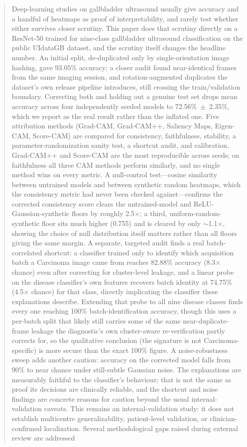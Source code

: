 \begin{abstract}
Deep-learning studies on gallbladder ultrasound usually give accuracy and a handful of heatmaps as proof of interpretability, and rarely test whether either survives closer scrutiny. This paper does that scrutiny directly on a ResNet-50 trained for nine-class gallbladder ultrasound classification on the public UIdataGB dataset, and the scrutiny itself changes the headline number. An initial split, de-duplicated only by single-orientation image hashing, gave 93.05\% accuracy; a closer audit found near-identical frames from the same imaging session, and rotation-augmented duplicates the dataset's own release pipeline introduces, still crossing the train/validation boundary. Correcting both and holding out a genuine test set drops mean accuracy across four independently seeded models to 72.56\%~$\pm$~2.35\%, which we report as the real result rather than the inflated one. Five attribution methods (Grad-CAM, Grad-CAM++, Saliency Maps, Eigen-CAM, Score-CAM) are compared for consistency, faithfulness, stability, a parameter-randomization sanity test, a shortcut audit, and calibration. Grad-CAM++ and Score-CAM are the most reproducible across seeds; on faithfulness all three CAM methods perform similarly, and no single method wins on every metric. A null-control test---cosine similarity between untrained models and between synthetic random heatmaps, which the consistency metric had never been checked against---confirms the corrected consistency score clears the untrained-model and ReLU-Gaussian-synthetic floors by roughly 2.5$\times$; a third, uniform-random-synthetic floor sits much higher (0.755) and is cleared by only $\sim$1.1$\times$, showing the choice of null distribution itself matters rather than all floors giving the same margin. A separate, targeted audit finds a real batch-correlated shortcut: a classifier trained only to identify which acquisition batch a Carcinoma image came from reaches 82.88\% accuracy (8.3$\times$ chance) even after correcting for cluster-level leakage, and a linear probe on the disease classifier's own features recovers batch identity at 74.75\% (4.5$\times$ chance) for that class, directly implicating the classifier these explanations describe. Extending that probe to all nine disease classes finds every one reaching 100\% batch-identification accuracy, though this uses a per-batch split that likely still carries some of the same near-duplicate-frame leakage the diagnostic's own cluster-aware re-verification partly corrects for, so the qualitative conclusion (the signature is not Carcinoma-specific) is more secure than the exact 100\% figure. A noise-robustness sweep adds another caution: accuracy on the corrected model falls from 90\% to near chance under still-subtle Gaussian noise. The explanations are measurably faithful to the classifier's behaviour; that is not the same as proof its decisions are clinically reliable, and the shortcut and noise findings are concrete reasons for caution beyond the usual internal-validation caveats. This remains an internal-validation study: it does not establish multicentre generalizability, patient-level validation, or clinician-confirmed localization. Several methodological gaps raised during external review are addressed 
\end{abstract}
